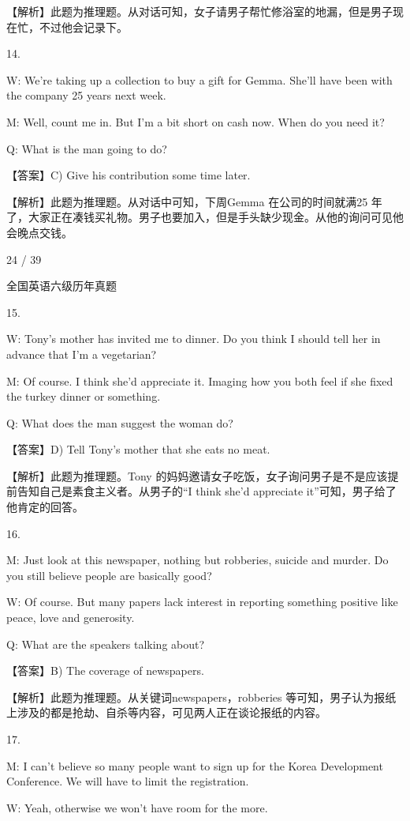 \documentclass[UTF8,11pt]{ctexart}
\begin{document}
【解析】此题为推理题。从对话可知，女子请男子帮忙修浴室的地漏，但是男子现在忙，不过他会记录下。


14.


W: We’re taking up a collection to buy a gift for Gemma. She’ll have been with the company 25 years next week.


M: Well, count me in. But I’m a bit short on cash now. When do you need it?


Q: What is the man going to do?


【答案】C) Give his contribution some time later.


【解析】此题为推理题。从对话中可知，下周Gemma 在公司的时间就满25 年了，大家正在凑钱买礼物。男子也要加入，但是手头缺少现金。从他的询问可见他会晚点交钱。


24 / 39


全国英语六级历年真题


15.


W: Tony’s mother has invited me to dinner. Do you think I should tell her in advance that I’m a vegetarian?


M: Of course. I think she’d appreciate it. Imaging how you both feel if she fixed the turkey dinner or something.


Q: What does the man suggest the woman do?


【答案】D) Tell Tony’s mother that she eats no meat.


【解析】此题为推理题。Tony 的妈妈邀请女子吃饭，女子询问男子是不是应该提前告知自己是素食主义者。从男子的“I think she’d appreciate it”可知，男子给了他肯定的回答。


16.


M: Just look at this newspaper, nothing but robberies, suicide and murder. Do you still believe people are basically good?


W: Of course. But many papers lack interest in reporting something positive like peace, love and generosity.


Q: What are the speakers talking about?


【答案】B) The coverage of newspapers.


【解析】此题为推理题。从关键词newspapers，robberies 等可知，男子认为报纸上涉及的都是抢劫、自杀等内容，可见两人正在谈论报纸的内容。


17.


M: I can’t believe so many people want to sign up for the Korea Development Conference. We will have to limit the registration.


W: Yeah, otherwise we won’t have room for the more.
\end{document}
